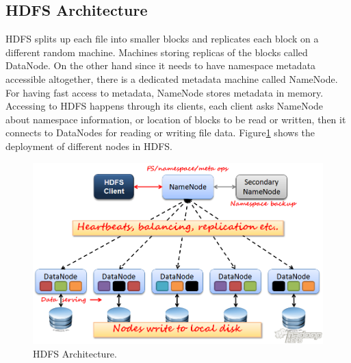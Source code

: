  \subsection{HDFS Architecture}
HDFS  splits   up  each  file  into  smaller  blocks  and replicates  each block  on a different random
machine.  Machines   storing  replicas   of  the  blocks   called  DataNode. On the other hand since
it  needs   to  have  namespace  metadata  accessible  altogether,  there  is   a  dedicated metadata
machine  called  NameNode.  For  having  fast  access   to  metadata,  NameNode  stores
metadata  in  memory.  Accessing  to  HDFS  happens   through  its   clients,  each  client  asks
NameNode  about  namespace  information,  or  location  of  blocks   to  be  read  or  written, then it
connects   to  DataNodes   for  reading  or  writing  file  data.  Figure\ref{fig:HDFS_Architecture}  shows   the  deployment  of
different nodes in HDFS.
\begin{figure}[htb]
  \centering
 \includegraphics[scale=0.5]{figs/preliminar/HDFS_Architecture.png}
  \caption{HDFS Architecture.}
  \label{fig:HDFS_Architecture}
\end{figure}
